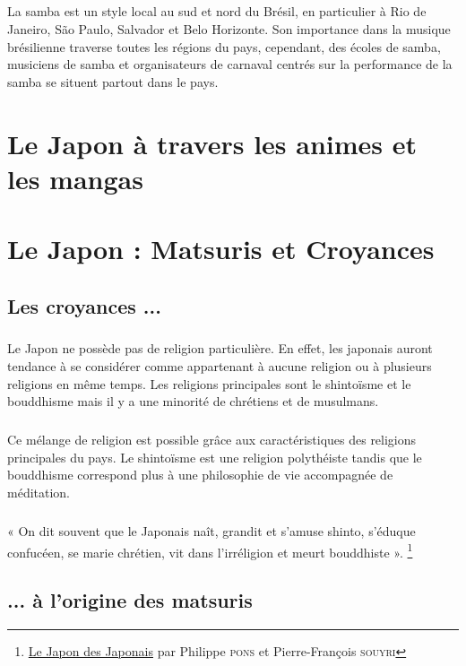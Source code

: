 \paragraph{}
La	samba	est	un	style	local	au	sud	et	nord	du	Brésil,	en	particulier	à Rio	de	Janeiro, São	Paulo,	Salvador	et	Belo	Horizonte.	Son	importance dans	la	musique	brésilienne	traverse	toutes	les	régions	du	pays,	cependant, des	écoles	de	samba,	musiciens	de samba	et	organisateurs	de	carnaval centrés	sur	la	performance	de	la	samba	se situent	partout	dans	le	pays.

\chapter{Le Japon à travers les animes et les mangas}

\chapter{Le Japon : Matsuris et Croyances}
\section{Les croyances ...}
\paragraph{}
Le Japon ne possède pas de religion particulière. En effet, les japonais auront tendance à se considérer comme appartenant à aucune religion ou à plusieurs religions en même temps. Les religions principales sont le shintoïsme et le bouddhisme mais il y a une minorité de chrétiens et de musulmans. 
\paragraph{}
Ce mélange de religion est possible grâce aux caractéristiques des religions principales du pays. Le shintoïsme est une religion polythéiste tandis que le bouddhisme correspond plus à une philosophie de vie accompagnée de méditation.
\paragraph{}
« On dit souvent que le Japonais naît, grandit et s’amuse shinto, s’éduque confucéen, se marie chrétien, vit dans l’irréligion et meurt bouddhiste ». 
\footnote{\underline{Le Japon des Japonais} par Philippe \textsc{pons} et Pierre-François \textsc{souyri}}

\section{... à l'origine des matsuris}
